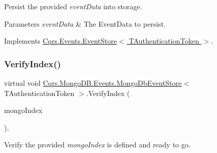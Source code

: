 Persist the provided {\itshape event\+Data}  into storage. 


\begin{DoxyParams}{Parameters}
{\em event\+Data} & The Event\+Data to persist.\\
\hline
\end{DoxyParams}


Implements \hyperlink{classCqrs_1_1Events_1_1EventStore_aedb71ca0ddf21220e323bc60ad7508cd_aedb71ca0ddf21220e323bc60ad7508cd}{Cqrs.\+Events.\+Event\+Store$<$ T\+Authentication\+Token $>$}.

\mbox{\label{classCqrs_1_1MongoDB_1_1Events_1_1MongoDbEventStore_a6a6f0303cd412974d90be87d281e81f5_a6a6f0303cd412974d90be87d281e81f5}} 
\subsubsection{\texorpdfstring{Verify\+Index()}{VerifyIndex()}}
{\footnotesize\ttfamily virtual void \hyperlink{classCqrs_1_1MongoDB_1_1Events_1_1MongoDbEventStore}{Cqrs.\+Mongo\+D\+B.\+Events.\+Mongo\+Db\+Event\+Store}$<$ T\+Authentication\+Token $>$.Verify\+Index (\begin{DoxyParamCaption}\item[{\hyperlink{classCqrs_1_1MongoDB_1_1DataStores_1_1Indexes_1_1MongoDbIndex}{Mongo\+Db\+Index}$<$ \hyperlink{classCqrs_1_1MongoDB_1_1Events_1_1MongoDbEventData}{Mongo\+Db\+Event\+Data} $>$}]{mongo\+Index }\end{DoxyParamCaption})\hspace{0.3cm}{\ttfamily [protected]}, {\ttfamily [virtual]}}



Verify the provided {\itshape mongo\+Index}  is defined and ready to go. 

\mbox{\label{classCqrs_1_1MongoDB_1_1Events_1_1MongoDbEventStore_a60ae02928a3ae8cb99d46f6c340b5138_a60ae02928a3ae8cb99d46f6c340b5138}} 
